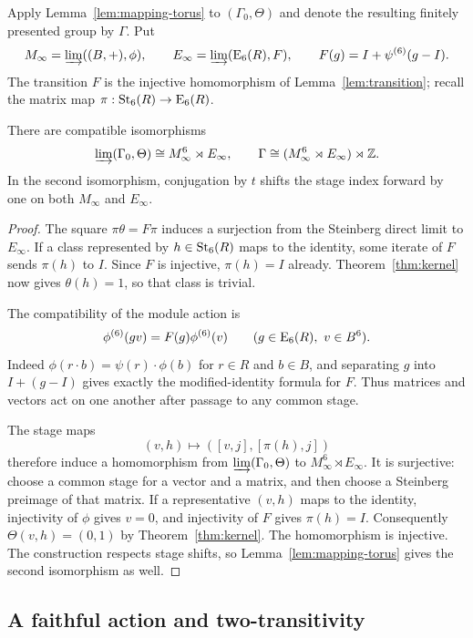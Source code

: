 Apply Lemma~\ref{lem:mapping-torus} to $(\Gamma_0,\Theta)$ and denote
the resulting finitely presented group by $\Gamma$.  Put
\[
 M_\infty=\varinjlim((B,+),\phi),\qquad
 E_\infty=\varinjlim(\operatorname{E}_6(R),F),
 \qquad F(g)=I+\psi^{(6)}(g-I).
\]
The transition $F$ is the injective homomorphism of
Lemma~\ref{lem:transition}; recall the matrix map
$\pi:\operatorname{St}_6(R)\to\operatorname{E}_6(R)$.

\begin{lemma}\label{lem:affine-limit}
There are compatible isomorphisms
\[
 \varinjlim(\Gamma_0,\Theta)
 \cong M_\infty^6\rtimes E_\infty,
 \qquad
 \Gamma\cong(M_\infty^6\rtimes E_\infty)\rtimes\mathbb Z.
\]
In the second isomorphism, conjugation by $t$ shifts the stage index
forward by one on both $M_\infty$ and $E_\infty$.
\end{lemma}

\begin{proof}
The square $\pi\theta=F\pi$ induces a surjection from the
Steinberg direct limit to $E_\infty$.  If a class represented by
$h\in\operatorname{St}_6(R)$ maps to the identity, some iterate of $F$ sends
$\pi(h)$ to $I$.  Since $F$ is injective, $\pi(h)=I$ already.
Theorem~\ref{thm:kernel} now gives $\theta(h)=1$, so that class is
trivial.

The compatibility of the module action is
\begin{equation}\label{eq:action-transition}
 \phi^{(6)}(g v)=F(g)\phi^{(6)}(v)
 \qquad(g\in\operatorname{E}_6(R),\ v\in B^6).
\end{equation}
Indeed $\phi(r\cdot b)=\psi(r)\cdot\phi(b)$ for $r\in R$ and
$b\in B$, and separating $g$ into $I+(g-I)$ gives exactly the
modified-identity formula for $F$.  Thus matrices and vectors act on one
another after passage to any common stage.

The stage maps
\[
 (v,h)\longmapsto([v,j],[\pi(h),j])
\]
therefore induce a homomorphism from $\varinjlim(\Gamma_0,\Theta)$ to
$M_\infty^6\rtimes E_\infty$.  It is surjective: choose a common stage
for a vector and a matrix, and then choose a Steinberg preimage of that
matrix.  If a representative $(v,h)$ maps to the identity, injectivity
of $\phi$ gives $v=0$, and injectivity of $F$ gives $\pi(h)=I$.
Consequently $\Theta(v,h)=(0,1)$ by Theorem~\ref{thm:kernel}.  The
homomorphism is injective.  The construction respects stage shifts, so
Lemma~\ref{lem:mapping-torus} gives the second isomorphism as well.
\end{proof}

\subsection{A faithful action and two-transitivity}

